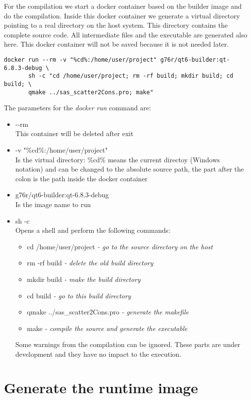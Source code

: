 \documentclass[11pt]{article} %
\begin{document}
For the compilation we start a docker container based on the builder image and do the compilation. Inside this docker container we generate a virtual directory pointing to a real directory on the host system. This directory contains the complete source code. All intermediate files and the executable are generated also here. This docker container will not be saved because it is not needed later.

\begin{lstlisting}[frame=single]
docker run --rm -v "%cd%:/home/user/project" g76r/qt6-builder:qt-6.8.3-debug \
       sh -c "cd /home/user/project; rm -rf build; mkdir build; cd build; \
       qmake ../sas_scatter2Cons.pro; make"
\end{lstlisting}
The parameters for the {\it docker run} command are:
\begin{itemize}\itemsep0pt
\item -{}-rm \\
	This container will be deleted after exit
\item -v "\%cd\%:/home/user/project" \\
	Is the virtual directory: \%cd\% means the current directoy (Windows notation) and can be changed to the absolute source path, the part after the colon is the path inside the docker container
\item g76r/qt6-builder:qt-6.8.3-debug \\
	Is the image name to run
\item sh -c \\
	Opens a shell and perform the following commands:
	\begin{itemize}[*]\itemsep0pt
	\item cd /home/user/project {\it - go to the source directory on the host}
	\item rm -rf build {\it - delete the old build directory}
	\item mkdir build {\it - make the build directory}
	\item cd build {\it - go to this build directory}
	\item qmake ../sas\_scatter2Cons.pro {\it - generate the makefile}
	\item make {\it - compile the source and generate the executable}
	\end{itemize}
	Some warnings from the compilation can be ignored. These parts are under development and they have no impact to the execution.
\end{itemize}


\section{Generate the runtime image} %
\end{document}
